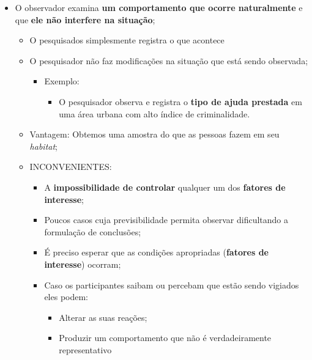\documentclass[
]{book}
\providecommand{\tightlist}{%
  \setlength{\itemsep}{0pt}\setlength{\parskip}{0pt}}
\begin{document}
\begin{itemize}
\tightlist
\item
  O observador examina \textbf{um comportamento que ocorre naturalmente} e
  que \textbf{ele não interfere na situação};

  \begin{itemize}
  \tightlist
  \item
    O pesquisados simplesmente registra o que acontece
  \item
    O pesquisador não faz modificações na situação que está sendo
    observada;

    \begin{itemize}
    \tightlist
    \item
      Exemplo:

      \begin{itemize}
      \tightlist
      \item
        O pesquisador observa e registra o \textbf{tipo de ajuda
        prestada} em uma área urbana com alto índice de
        criminalidade.
      \end{itemize}
    \end{itemize}
  \item
    Vantagem: Obtemos uma amostra do que as pessoas fazem em seu
    \emph{habitat};
  \item
    INCONVENIENTES:

    \begin{itemize}
    \tightlist
    \item
      A \textbf{impossibilidade de controlar} qualquer um dos \textbf{fatores
      de interesse};
    \item
      Poucos casos cuja previsibilidade permita observar
      dificultando a formulação de conclusões;
    \item
      É preciso esperar que as condições apropriadas (\textbf{fatores de
      interesse}) ocorram;
    \item
      Caso os participantes saibam ou percebam que estão sendo
      vigiados eles podem:

      \begin{itemize}
      \tightlist
      \item
        Alterar as suas reações;
      \item
        Produzir um comportamento que não é verdadeiramente
        representativo
      \end{itemize}
    \end{itemize}
  \end{itemize}
\end{itemize}
\end{document}
